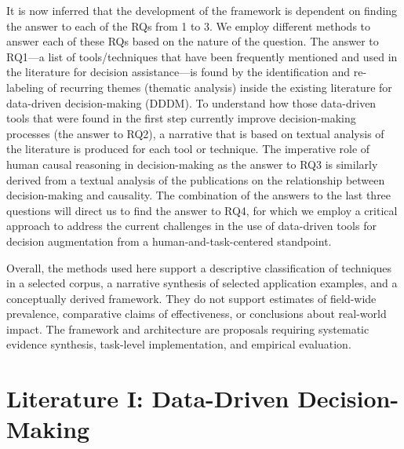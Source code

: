 \documentclass{sfuthesis}
\begin{document}
It is now inferred that the development of the framework is dependent on finding the answer to each of the RQs from 1 to 3. We employ different methods to answer each of these RQs based on the nature of the question. The answer to RQ1—a list of tools/techniques that have been frequently mentioned and used in the literature for decision assistance—is found by the identification and re-labeling of recurring themes (thematic analysis) inside the existing literature for data-driven decision-making (DDDM). To understand how those data-driven tools that were found in the first step currently improve decision-making processes (the answer to RQ2), a narrative that is based on textual analysis of the literature is produced for each tool or technique. The imperative role of human causal reasoning in decision-making as the answer to RQ3 is similarly derived from a textual analysis of the publications on the relationship between decision-making and causality. The combination of the answers to the last three questions will direct us to find the answer to RQ4, for which we employ a critical approach to address the current challenges in the use of data-driven tools for decision augmentation from a human-and-task-centered standpoint. 

Overall, the methods used here support a descriptive classification of techniques in a selected corpus, a narrative synthesis of selected application examples, and a conceptually derived framework. They do not support estimates of field-wide prevalence, comparative claims of effectiveness, or conclusions about real-world impact. The framework and architecture are proposals requiring systematic evidence synthesis, task-level implementation, and empirical evaluation.

\chapter{Literature I: Data-Driven Decision-Making}
\end{document}
